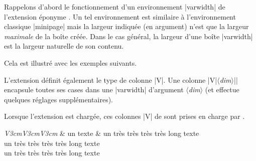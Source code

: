 \documentclass[dvipsnames]{article}
\begin{document}
\label{varwidth}

Rappelons d'abord le fonctionnement d'un environnement |{varwidth}| de
l'extension éponyme . Un tel environnement est similaire à
l'environnement classique |{minipage}| mais la largeur indiquée (en argument)
n'est que la largeur \emph{maximale} de la boîte créée. Dans le cas général, la
largeur d'une boîte |{varwidth}| est la largeur naturelle de son contenu.

\medbreak
Cela est illustré avec les exemples suivants.

\medskip
\begin{Code}[width=6cm,show-output]
\end{Code}

\bigskip
\begin{Code}[width=6cm,show-output]
\end{Code}

\bigbreak
L'extension  définit également le type de colonne |V|. Une colonne
|V{|$\langle$\textsl{dim}$\rangle$|}| encapsule toutes ses cases dans une
|{varwidth}| d'argument $\langle$\textsl{dim}$\rangle$ (et effectue quelques
réglages supplémentaires).

\medskip
Lorsque l'extension  est chargée, ces colonnes |V| de
 sont prises en charge par . 

\medskip
\begin{Code}
\begin{NiceTabular}[corners=NW,hvlines]{\emph{V{3cm}V{3cm}V{3cm}}}
  & un texte & un très très très très long texte \\
  un très très très très long texte \\
  un très très très très long texte 
\end{NiceTabular}
\end{Code}
\end{document}
